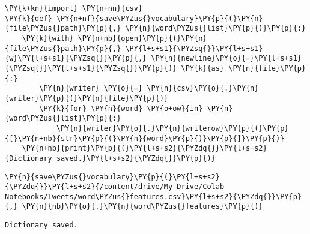     \begin{tcolorbox}[breakable, size=fbox, boxrule=1pt, pad at break*=1mm,colback=cellbackground, colframe=cellborder]
\begin{Verbatim}[commandchars=\\\{\}]
\PY{k+kn}{import} \PY{n+nn}{csv}
\PY{k}{def} \PY{n+nf}{save\PYZus{}vocabulary}\PY{p}{(}\PY{n}{file\PYZus{}path}\PY{p}{,} \PY{n}{word\PYZus{}list}\PY{p}{)}\PY{p}{:}
    \PY{k}{with} \PY{n+nb}{open}\PY{p}{(}\PY{n}{file\PYZus{}path}\PY{p}{,} \PY{l+s+s1}{\PYZsq{}}\PY{l+s+s1}{w}\PY{l+s+s1}{\PYZsq{}}\PY{p}{,} \PY{n}{newline}\PY{o}{=}\PY{l+s+s1}{\PYZsq{}}\PY{l+s+s1}{\PYZsq{}}\PY{p}{)} \PY{k}{as} \PY{n}{file}\PY{p}{:}
        \PY{n}{writer} \PY{o}{=} \PY{n}{csv}\PY{o}{.}\PY{n}{writer}\PY{p}{(}\PY{n}{file}\PY{p}{)}
        \PY{k}{for} \PY{n}{word} \PY{o+ow}{in} \PY{n}{word\PYZus{}list}\PY{p}{:}
            \PY{n}{writer}\PY{o}{.}\PY{n}{writerow}\PY{p}{(}\PY{p}{[}\PY{n+nb}{str}\PY{p}{(}\PY{n}{word}\PY{p}{)}\PY{p}{]}\PY{p}{)}
    \PY{n+nb}{print}\PY{p}{(}\PY{l+s+s2}{\PYZdq{}}\PY{l+s+s2}{Dictionary saved.}\PY{l+s+s2}{\PYZdq{}}\PY{p}{)}
\end{Verbatim}
\end{tcolorbox}

    \begin{tcolorbox}[breakable, size=fbox, boxrule=1pt, pad at break*=1mm,colback=cellbackground, colframe=cellborder]
\begin{Verbatim}[commandchars=\\\{\}]
\PY{n}{save\PYZus{}vocabulary}\PY{p}{(}\PY{l+s+s2}{\PYZdq{}}\PY{l+s+s2}{/content/drive/My Drive/Colab Notebooks/Tweets/word\PYZus{}features.csv}\PY{l+s+s2}{\PYZdq{}}\PY{p}{,} \PY{n}{nb}\PY{o}{.}\PY{n}{word\PYZus{}features}\PY{p}{)}
\end{Verbatim}
\end{tcolorbox}

    \begin{Verbatim}[commandchars=\\\{\}]
Dictionary saved.
    \end{Verbatim}
